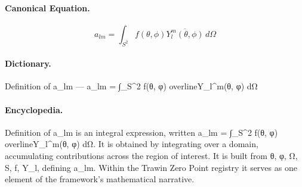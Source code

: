 \paragraph{Canonical Equation.}
\[
a_{lm} = \int_{S^2} f(\theta, \phi) \overline{Y_l^m(\theta, \phi)} \, d\Omega
\]

\paragraph{Dictionary.}
Definition of a\_lm — a\_lm = ∫\_S\textasciicircum{}2 f(θ, φ) overlineY\_l\textasciicircum{}m(θ, φ) dΩ

\paragraph{Encyclopedia.}
Definition of a\_lm is an integral expression, written a\_lm = ∫\_S\textasciicircum{}2 f(θ, φ) overlineY\_l\textasciicircum{}m(θ, φ) dΩ. It is obtained by integrating over a domain, accumulating contributions across the region of interest. It is built from θ, φ, Ω, S, f, Y\_l, defining a\_lm. Within the Trawin Zero Point registry it serves as one element of the framework's mathematical narrative.
